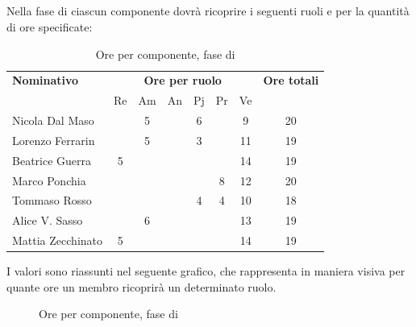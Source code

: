 \subsection{\VV}
Nella fase di \VV ciascun componente dovrà ricoprire i seguenti ruoli e per la quantità di ore specificate:

\begin{table}[H]
	\centering
	\begin{tabular}{|l|c|c|c|c|c|c|c|}
		\hline
		\textbf{Nominativo} & 
		\multicolumn{6}{c|}{\textbf{Ore per ruolo}} & 
		\textbf{Ore totali} \\
		& Re & Am & An & Pj & Pr & Ve & \\
		\hline
		Nicola Dal Maso & &5 & &6 & &9 & 20 \\
		Lorenzo Ferrarin & &5 & &3 & &11 & 19 \\
		Beatrice Guerra &5 & & & & &14 & 19 \\
		Marco Ponchia & & & & &8 &12 & 20 \\
		Tommaso Rosso & & & &4 &4 &10 & 18 \\
		Alice V. Sasso & &6 & & & &13 & 19 \\
		Mattia Zecchinato &5 & & & & &14 & 19 \\
		\hline
	\end{tabular}
	\caption{Ore per componente, fase di \VV}
\end{table}
I valori sono riassunti nel seguente grafico, che rappresenta in maniera visiva per quante ore un membro ricoprirà un determinato ruolo.
\begin{figure}[H]
	\centering
	\caption{Ore per componente, fase di \VV}
\end{figure}

